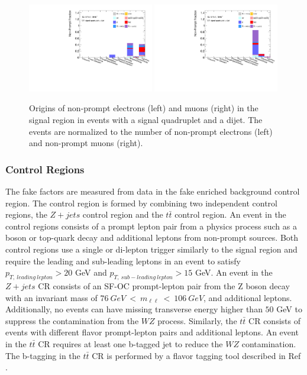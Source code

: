\begin{figure}[!htb]
    \centering
    \includegraphics[width = 0.49\textwidth]{figures/Analysis/Background/NonPromptElectronSRVBSComposition.pdf}
    \includegraphics[width = 0.49\textwidth]{figures/Analysis/Background/NonPromptMuonSRVBSComposition.pdf}
    \caption{ Origins of non-prompt electrons (left) and muons (right) in the signal region in events with a signal quadruplet and a dijet. The events are normalized to the number of non-prompt electrons (left) and non-prompt muons (right). \label{fig:NonPromptLepSRDijet}}
\end{figure}

\subsubsection{Control Regions}
\label{subsubsec:CR}
The fake factors are measured from data in the fake enriched background control region. The control region is formed by combining two independent control regions, the $Z+jets$ control region and the $t\bar{t}$ control region. An event in the control regions consists of a prompt lepton pair from a physics process such as a boson or top-quark decay and additional leptons from non-prompt sources. Both control regions use a single or di-lepton trigger similarly to the signal region and require the leading and sub-leading leptons in an event to satisfy $p_{T,~leading~lepton} > 20$ GeV and $p_{T,~sub-leading~lepton} > 15$ GeV. An event in the $Z+jets$ CR consists of an SF-OC prompt-lepton pair from the Z boson decay with an invariant mass of $ 76~GeV~<~m_{\ell \ell}~<~106~GeV$, and additional leptons. Additionally, no events can have missing transverse energy higher than $50$ GeV to suppress the contamination from the $WZ$ process. Similarly, the $t\bar{t}$ CR consists of events with different flavor prompt-lepton pairs and additional leptons. An event in the $t\bar{t}$ CR requires at least one b-tagged jet to reduce the $WZ$ contamination. The b-tagging in the $t\bar{t}$ CR is performed by a flavor tagging tool described in Ref \cite{btagATLAS}.

